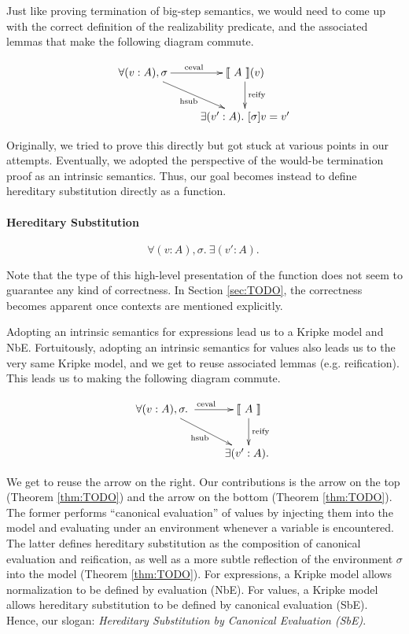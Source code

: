 \documentclass[preprint,nonatbib]{sigplanconf}
\numberwithin{subdefin}{defin}
\theoremstyle{definition}
\numberwithin{subtheorem}{theorem}
\numberwithin{sublemma}{theorem}
\numberwithin{corollary}{theorem}
\numberwithin{case}{theorem}
\numberwithin{slcase}{sublemma}
\numberwithin{scase}{subtheorem}
\numberwithin{lcase}{lemma}
\newcommand{\refthm}[1]{Theorem \ref{thm:#1}}
\newcommand{\refsec}[1]{Section \ref{sec:#1}}
\newcommand{\ascribe}[2]{(#1 : #2)}
\newcommand{\all}[1]{\forall#1.~}
\newcommand{\ex}[1]{\exists#1.~}
\newcommand{\el}[1]{\llbracket ~ #1 ~ \rrbracket}
\newcommand{\fun}[1]{\textmd{#1}}
\begin{document}
Just like proving termination of big-step semantics, we would need to
come up with the correct definition of the realizability predicate,
and the associated lemmas that make the following diagram commute.

\begin{displaymath}
    \xymatrix{
          {\forall (v : A), \sigma} 
          \ar[dr]_{\fun{hsub}}
          \ar[r]^{\fun{ceval}}
        & {\el{A}(v)}
          \ar[d]^{\large{\fun{reify}}}
\\      & {\exists (v' : A). ~ [ \sigma ] v = v'} }
\end{displaymath}

Originally, we tried to prove this directly but got stuck at various
points in our attempts. Eventually, we adopted the perspective of the
would-be termination proof as an intrinsic semantics. Thus, our goal
becomes instead to define hereditary substitution directly as a
function.

\paragraph{Hereditary Substitution}
$$
\all{\ascribe{v}{A}, \sigma} \ex{\ascribe{v'}{A}}
$$

Note that the type of this high-level presentation of the function does
not seem to guarantee any kind of correctness. In \refsec{TODO}, the
correctness becomes apparent once contexts are mentioned explicitly.

Adopting an intrinsic semantics for expressions lead us to a Kripke
model and NbE. Fortuitously, adopting an intrinsic semantics for
values also leads us to the very same Kripke model, and we get to
reuse associated lemmas (e.g. reification). This leads us to making
the following diagram commute.

\begin{displaymath}
    \xymatrix{
          \all{\ascribe{v}{A}, \sigma}
          \ar[dr]_{\fun{hsub}}
          \ar[r]^{\fun{ceval}}
        & {\el{A}}
          \ar[d]^{\large{\fun{reify}}}
\\      & \ex{\ascribe{v'}{A}} }
\end{displaymath}

We get to reuse the arrow on the right. Our contributions is the arrow
on the top (\refthm{TODO}) and the arrow on the bottom
(\refthm{TODO}). 
The former performs ``canonical evaluation'' of values by injecting
them into the model and evaluating under an environment whenever a
variable is encountered. The latter defines hereditary substitution as
the composition of canonical evaluation and reification, as well as a
more subtle reflection of the environment  $\sigma$ into the model
(\refthm{TODO}).
For expressions, a Kripke model allows
normalization to be defined by evaluation (NbE). For values, a Kripke
model allows hereditary substitution to be defined by canonical
evaluation (SbE). Hence, our slogan:
{\it Hereditary Substitution by Canonical Evaluation (SbE)}.
\end{document}
